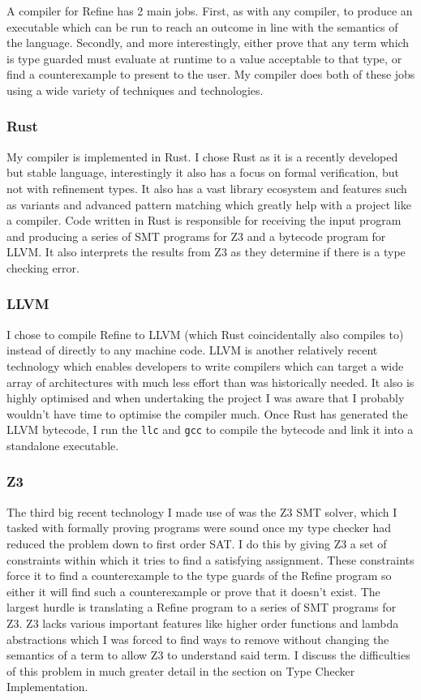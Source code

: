 A compiler for Refine has 2 main jobs.
First, as with any compiler, to produce an executable which can be run to reach an outcome in line
with the semantics of the language.
Secondly, and more interestingly, either prove that any term which is type guarded must evaluate
at runtime to a value acceptable to that type, or find a counterexample to present to the user.
My compiler does both of these jobs using a wide variety of techniques and technologies.

\subsubsection{Rust}

My compiler is implemented in Rust.
I chose Rust as it is a recently developed but stable language, interestingly it also has a focus
on formal verification, but not with refinement types.
It also has a vast library ecosystem and features such as variants and advanced pattern matching
which greatly help with a project like a compiler.
Code written in Rust is responsible for receiving the input program and producing a series of SMT
programs for Z3 and a bytecode program for LLVM.
It also interprets the results from Z3 as they determine if there is a type checking error.

\subsubsection{LLVM}

I chose to compile Refine to LLVM (which Rust coincidentally also compiles to) instead of
directly to any machine code.
LLVM is another relatively recent technology which enables developers to write compilers which can
target a wide array of architectures with much less effort than was historically needed.
It also is highly optimised and when undertaking the project I was aware that I probably wouldn't
have time to optimise the compiler much.
Once Rust has generated the LLVM bytecode, I run the \texttt{llc} and \texttt{gcc} to compile the
bytecode and link it into a standalone executable.

\subsubsection{Z3}

The third big recent technology I made use of was the Z3 SMT solver, which I tasked with formally
proving programs were sound once my type checker had reduced the problem down to first order SAT.
I do this by giving Z3 a set of constraints within which it tries to find a satisfying assignment.
These constraints force it to find a counterexample to the type guards of the Refine program so
either it will find such a counterexample or prove that it doesn't exist.
The largest hurdle is translating a Refine program to a series of SMT programs for Z3.
Z3 lacks various important features like higher order functions and lambda abstractions which I
was forced to find ways to remove without changing the semantics of a term to allow Z3 to understand
said term.
I discuss the difficulties of this problem in much greater detail in the section on
Type Checker Implementation.

